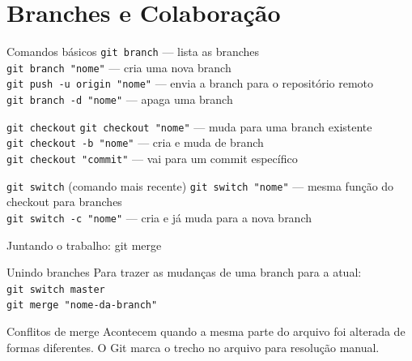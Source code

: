 \section{Branches e Colaboração}

\begin{frame}
  \begin{block}{Comandos básicos}
    \texttt{git branch} \quad — lista as branches \\
    \texttt{git branch "nome"} \quad — cria uma nova branch \\
    \texttt{git push -u origin "nome"} \quad — envia a branch para o repositório remoto \\
    \texttt{git branch -d "nome"} \quad — apaga uma branch
  \end{block}
  \begin{block}{\texttt{git checkout}}
    \texttt{git checkout "nome"} \quad — muda para uma branch existente \\
    \texttt{git checkout -b "nome"} \quad — cria e muda de branch \\
    \texttt{git checkout "commit"} \quad — vai para um commit específico
  \end{block}
  \begin{block}{\texttt{git switch} (comando mais recente)}
    \texttt{git switch "nome"} \quad — mesma função do checkout para branches \\
    \texttt{git switch -c "nome"} \quad — cria e já muda para a nova branch
  \end{block}
\end{frame}

\begin{frame}{Juntando o trabalho: git merge}
  \begin{block}{Unindo branches}
    Para trazer as mudanças de uma branch para a atual:
    \vspace{0.2cm} \\
    \texttt{git switch master} \\
    \texttt{git merge "nome-da-branch"}
  \end{block}
  \begin{alertblock}{Conflitos de merge}
    Acontecem quando a mesma parte do arquivo foi alterada de formas diferentes. O Git marca o trecho no arquivo para resolução manual.
  \end{alertblock}
\end{frame}

